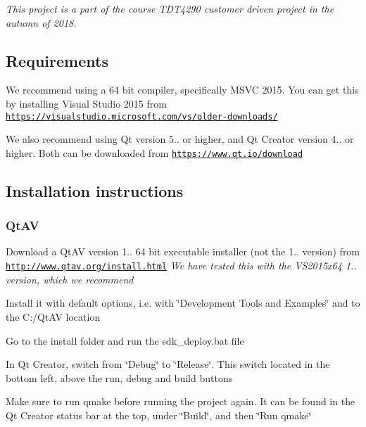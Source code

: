 {\itshape This project is a part of the course T\+D\+T4290 customer driven project in the autumn of 2018.}

 \subsection*{Requirements}

We recommend using a 64 bit compiler, specifically M\+S\+VC 2015. You can get this by installing Visual Studio 2015 from \href{https://visualstudio.microsoft.com/vs/older-downloads/}{\tt https\+://visualstudio.\+microsoft.\+com/vs/older-\/downloads/}

We also recommend using Qt version 5.. or higher, and Qt Creator version 4.. or higher. Both can be downloaded from \href{https://www.qt.io/download}{\tt https\+://www.\+qt.\+io/download}

\subsection*{Installation instructions}

\subsubsection*{Qt\+AV}


\begin{DoxyEnumerate}
\item Download a Qt\+AV version 1.. 64 bit executable installer (not the 1.. version) from \href{http://www.qtav.org/install.html}{\tt http\+://www.\+qtav.\+org/install.\+html} {\itshape We have tested this with the V\+S2015x64 1.. version, which we recommend}
\item Install it with default options, i.\+e. with \char`\"{}\+Development Tools and Examples\char`\"{} and to the C\+:/\+Qt\+AV location
\item Go to the install folder and run the sdk\+\_\+deploy.\+bat file
\item In Qt Creator, switch from \char`\"{}\+Debug\char`\"{} to \char`\"{}\+Release\char`\"{}. This switch located in the bottom left, above the run, debug and build buttons
\item Make sure to run qmake before running the project again. It can be found in the Qt Creator status bar at the top, under \char`\"{}\+Build\char`\"{}, and then \char`\"{}\+Run qmake\char`\"{}
\end{DoxyEnumerate}


